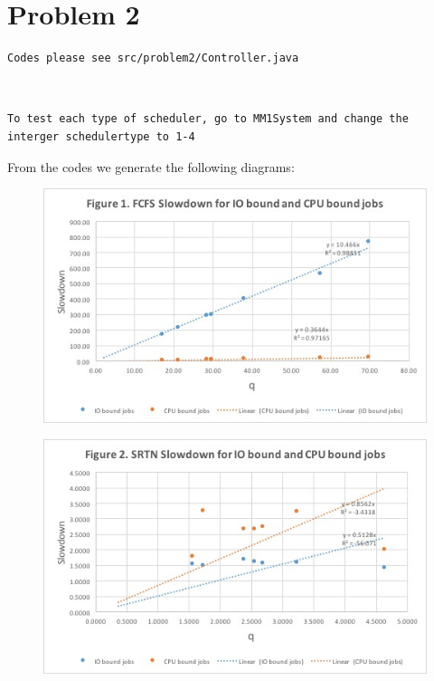 \documentclass{article}   	                         %
\begin{document}
\section*{Problem 2}
\begin{BVerbatim}
Codes please see src/problem2/Controller.java
\end{BVerbatim}
\\
\begin{BVerbatim}
To test each type of scheduler, go to MM1System and change the interger schedulertype to 1-4
\end{BVerbatim}
From the codes we generate the following diagrams:\\
\begin{figure}
\centering
\begin{minipage}{.5\textwidth}
  \centering
  \includegraphics[width=\linewidth]{Picture1.jpg}
  \label{fig:FIFO/FCFS}
\end{minipage}%
\begin{minipage}{.5\textwidth}
  \centering
  \includegraphics[width=\linewidth]{Picture2.jpg}
  \label{fig:SRTN}
\end{minipage}
\end{figure}
\end{document}
